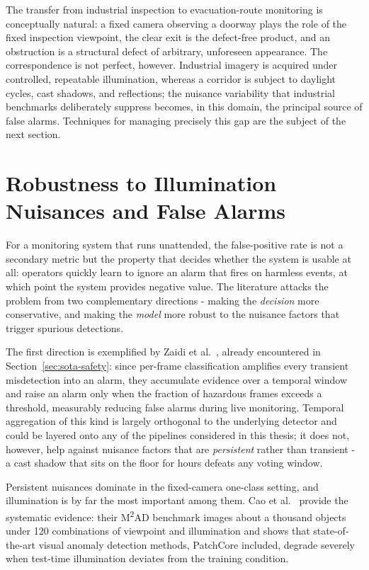 The transfer from industrial inspection to evacuation-route monitoring is
conceptually natural: a fixed camera observing a doorway plays the role of the
fixed inspection viewpoint, the clear exit is the defect-free product, and an
obstruction is a structural defect of arbitrary, unforeseen appearance. The
correspondence is not perfect, however. Industrial imagery is acquired under
controlled, repeatable illumination, whereas a corridor is subject to daylight
cycles, cast shadows, and reflections; the nuisance variability that industrial
benchmarks deliberately suppress becomes, in this domain, the principal source
of false alarms. Techniques for managing precisely this gap are the subject of
the next section.

\section[Robustness to Illumination Nuisances]{Robustness to Illumination Nuisances and False Alarms}
\label{sec:sota-robustness}

For a monitoring system that runs unattended, the false-positive rate is not a
secondary metric but the property that decides whether the system is usable at
all: operators quickly learn to ignore an alarm that fires on harmless events,
at which point the system provides negative value. The literature attacks the
problem from two complementary directions - making the \emph{decision} more
conservative, and making the \emph{model} more robust to the nuisance factors
that trigger spurious detections.

The first direction is exemplified by Zaidi et al.~\cite{Zaidi2024}, already
encountered in Section~\ref{sec:sota-safety}: since per-frame classification
amplifies every transient misdetection into an alarm, they accumulate evidence
over a temporal window and raise an alarm only when the fraction of hazardous
frames exceeds a threshold, measurably reducing false alarms during live
monitoring. Temporal aggregation of this kind is largely orthogonal to the
underlying detector and could be layered onto any of the pipelines considered
in this thesis; it does not, however, help against nuisance factors that are
\emph{persistent} rather than transient - a cast shadow that sits on the floor
for hours defeats any voting window.

Persistent nuisances dominate in the fixed-camera one-class setting, and
illumination is by far the most important among them. Cao et
al.~\cite{Cao2025} provide the systematic evidence: their M\textsuperscript{2}AD
benchmark images about a thousand objects under 120 combinations of viewpoint
and illumination and shows that state-of-the-art visual anomaly detection
methods, PatchCore included, degrade severely when test-time illumination
deviates from the training condition.

